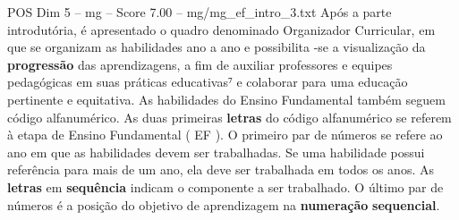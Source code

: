 \begin{textsample}{POS Dim 5 – mg – Score 7.00 – mg/mg\_ef\_intro\_3.txt}
Após a parte introdutória, é apresentado o quadro denominado Organizador Curricular, em que se organizam as habilidades ano a ano e possibilita -se a visualização da \textbf{progressão} das aprendizagens, a fim de auxiliar professores e equipes pedagógicas em suas práticas educativas⁷ e colaborar para uma educação pertinente e equitativa.
As habilidades do Ensino Fundamental também seguem código alfanumérico.
As duas primeiras \textbf{letras} do código alfanumérico se referem à etapa de Ensino Fundamental ( EF ).
O primeiro par de números se refere ao ano em que as habilidades devem ser trabalhadas.
Se uma habilidade possui referência para mais de um ano, ela deve ser trabalhada em todos os anos.
As \textbf{letras} em \textbf{sequência} indicam o componente a ser trabalhado.
O último par de números é a posição do objetivo de aprendizagem na \textbf{numeração} \textbf{sequencial}.

\end{textsample}

